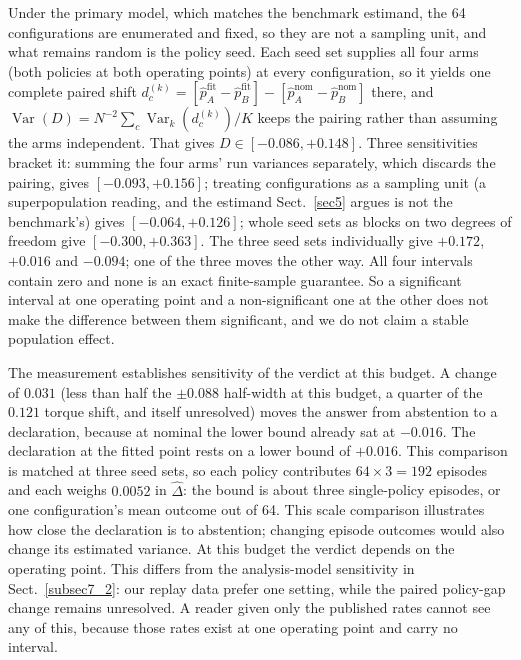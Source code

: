 \documentclass[pdflatex,iicol,sn-apa]{sn-jnl}
\theoremstyle{remark}
\begin{document}
Under the primary model, which matches the benchmark estimand, the 64 configurations
are enumerated and fixed, so they are not a sampling unit, and what remains random is the policy
seed. Each seed set supplies all four arms (both policies at both operating points) at every
configuration, so it yields one complete paired shift
$d_c^{(k)} = [\hat p_A^{\mathrm{fit}} - \hat p_B^{\mathrm{fit}}] - [\hat p_A^{\mathrm{nom}} - \hat p_B^{\mathrm{nom}}]$
there, and $\operatorname{Var}(D) = N^{-2}\sum_c \operatorname{Var}_k(d_c^{(k)})/K$ keeps the pairing
rather than assuming the arms independent. That gives
$D \in [-0.086, +0.148]$. Three sensitivities bracket it: summing the four arms' run
variances separately, which discards the pairing, gives $[-0.093, +0.156]$; treating configurations
as a sampling unit (a superpopulation reading, and the estimand
Sect.~\ref{sec5} argues is not the benchmark's) gives $[-0.064, +0.126]$; whole seed sets as
blocks on two degrees of freedom
give $[-0.300, +0.363]$. The three seed sets individually give $+0.172$, $+0.016$ and
$-0.094$; one of the three moves the other way. All four intervals contain zero and none
is an exact finite-sample guarantee. So a significant interval at one operating point and a
non-significant one at the other does not make the difference between them significant, and we do
not claim a stable population effect.

The measurement establishes sensitivity of the verdict at this budget. A change of $0.031$ (less than half the $\pm 0.088$ half-width at this
budget, a quarter of the $0.121$ torque shift, and itself unresolved) moves the answer from
abstention to a declaration, because at nominal the lower bound already sat at $-0.016$. The
declaration at the fitted point rests on a lower bound of $+0.016$. This comparison is matched at
three seed sets, so each policy contributes $64 \times 3 = 192$ episodes and each weighs $0.0052$ in
$\hat\Delta$: the bound is about three single-policy episodes, or one configuration's mean
outcome out of 64. This scale comparison illustrates how close the declaration is to abstention;
changing episode outcomes would also change its estimated variance. At this budget the verdict
depends on the operating point. This differs from the analysis-model sensitivity in
Sect.~\ref{subsec7_2}: our replay data prefer one setting, while the paired policy-gap change
remains unresolved. A reader given only the published rates
cannot see any of this, because those rates exist at one operating point and carry no interval.
\end{document}
